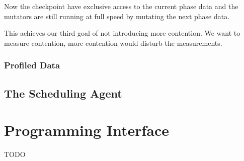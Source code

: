Now the checkpoint have exclusive access to the current phase data and the mutators are still running at full speed by mutating the next phase data.

This achieves our third goal of not introducing more contention. We want to measure contention, more contention would disturb the measurements.

\subsubsection{Profiled Data} \label{sec:agentprof}


\subsection{The Scheduling Agent}


\section{Programming Interface} \label{sec:api}
\fi

TODO

